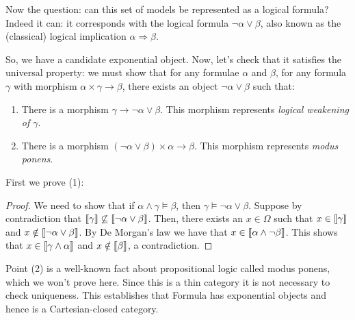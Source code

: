 Now the question: can
this set of models be represented as a logical formula? Indeed it can:
it corresponds with the logical formula $\neg \alpha \lor \beta$,
also known as the (classical) logical implication $\alpha \Rightarrow \beta$.

So, we have a candidate exponential object. Now, let's check that it
satisfies the universal property: we
must show that for any formulae $\alpha$ and $\beta$,
for any formula $\gamma$ with morphism $\alpha \times \gamma \to \beta$,
there exists an object $\neg \alpha \lor \beta$ such that:
\begin{enumerate}
  \item There is a morphism $\gamma \to \neg \alpha \lor \beta$. This morphism represents \emph{logical weakening of $\gamma$}.
  \item There is a morphism $(\neg \alpha \lor \beta) \times \alpha \to \beta$.
  This morphism represents \emph{modus ponens}.
\end{enumerate}
First we prove (1):
\begin{proof}
  We need to show that if $\alpha \land \gamma \models \beta$, then
  $\gamma \models \neg \alpha \lor \beta$.
  Suppose by contradiction that $\left\llbracket \gamma \right\rrbracket \not\subseteq \left\llbracket \neg \alpha \lor \beta \right\rrbracket$.
  Then, there exists an $x \in \Omega$ such that $x \in \left\llbracket \gamma \right\rrbracket$
  and $x \notin \left\llbracket \neg \alpha \lor \beta \right\rrbracket$.
  By De Morgan's law we have that $x \in \left\llbracket \alpha \land \neg \beta \right\rrbracket$.
  This shows that $x \in \left\llbracket \gamma \land \alpha \right\rrbracket$ and $x \notin \left\llbracket \beta \right\rrbracket$,
  a contradiction.
\end{proof}

Point (2) is a well-known fact about propositional logic called
modus ponens, which we won't prove here.
Since this is a thin category it is not necessary to check uniqueness.
This establishes that \textsf{Formula} has exponential objects and
hence is a Cartesian-closed category.


